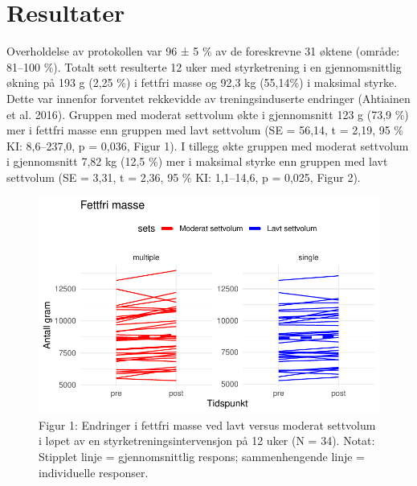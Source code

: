 \documentclass[
  letterpaper,
  DIV=11,
  numbers=noendperiod]{scrreprt}
\begin{document}
\hypertarget{resultater-2}{%
\section{Resultater}\label{resultater-2}}

Overholdelse av protokollen var 96 ± 5 \% av de foreskrevne 31 øktene
(område: 81--100 \%). Totalt sett resulterte 12 uker med styrketrening i
en gjennomsnittlig økning på 193 g (2,25 \%) i fettfri masse og 92,3 kg
(55,14\%) i maksimal styrke. Dette var innenfor forventet rekkevidde av
treningsinduserte endringer (Ahtiainen et al. 2016). Gruppen med moderat
settvolum økte i gjennomsnitt 123 g (73,9 \%) mer i fettfri masse enn
gruppen med lavt settvolum (SE = 56,14, t = 2,19, 95 \% KI: 8,6--237,0,
p = 0,036, Figur 1). I tillegg økte gruppen med moderat settvolum i
gjennomsnitt 7,82 kg (12,5 \%) mer i maksimal styrke enn gruppen med
lavt settvolum (SE = 3,31, t = 2,36, 95 \% KI: 1,1--14,6, p = 0,025,
Figur 2).

\begin{figure}

{\centering \includegraphics{05-analyse_av_repeterte_forsok_files/figure-pdf/Figur 1-1.pdf}

}

\caption{Figur 1: Endringer i fettfri masse ved lavt versus moderat
settvolum i løpet av en styrketreningsintervensjon på 12 uker (N = 34).
Notat: Stipplet linje = gjennomsnittlig respons; sammenhengende linje =
individuelle responser.}

\end{figure}
\end{document}
